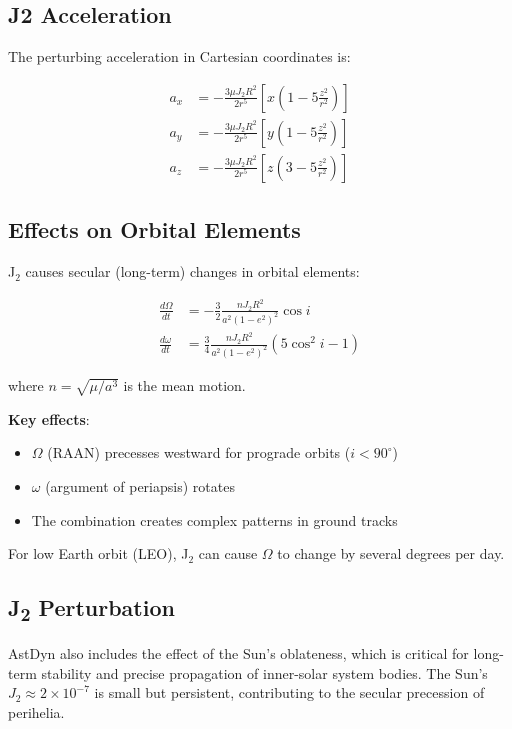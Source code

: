 \subsection{J2 Acceleration}

The perturbing acceleration in Cartesian coordinates is:

\begin{align}
    a_x &= -\frac{3\mu J_2 R^2}{2r^5}\left[x\left(1 - 5\frac{z^2}{r^2}\right)\right] \\
    a_y &= -\frac{3\mu J_2 R^2}{2r^5}\left[y\left(1 - 5\frac{z^2}{r^2}\right)\right] \\
    a_z &= -\frac{3\mu J_2 R^2}{2r^5}\left[z\left(3 - 5\frac{z^2}{r^2}\right)\right]
\end{align}

\subsection{Effects on Orbital Elements}

J$_2$ causes secular (long-term) changes in orbital elements:

\begin{align}
    \frac{d\Omega}{dt} &= -\frac{3}{2}\frac{n J_2 R^2}{a^2(1-e^2)^2}\cos i \\
    \frac{d\omega}{dt} &= \frac{3}{4}\frac{n J_2 R^2}{a^2(1-e^2)^2}(5\cos^2 i - 1)
\end{align}

where $n = \sqrt{\mu/a^3}$ is the mean motion.

\textbf{Key effects}:
\begin{itemize}
    \item $\Omega$ (RAAN) precesses westward for prograde orbits ($i < 90^\circ$)
    \item $\omega$ (argument of periapsis) rotates
    \item The combination creates complex patterns in ground tracks
\end{itemize}

For low Earth orbit (LEO), J$_2$ can cause $\Omega$ to change by several degrees per day.

\subsection{\texorpdfstring{J\textsubscript{2}}{J2} Perturbation}

AstDyn also includes the effect of the Sun's oblateness, which is critical for long-term stability and precise propagation of inner-solar system bodies. The Sun's $J_2 \approx 2 \times 10^{-7}$ is small but persistent, contributing to the secular precession of perihelia.

